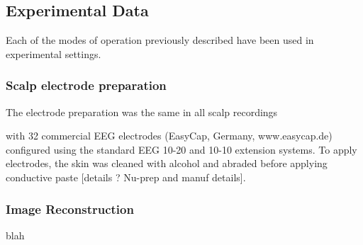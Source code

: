 \subsection{Experimental Data}


Each of the modes of operation previously described have been used in experimental settings. 

\subsubsection{Scalp electrode preparation}
The electrode preparation was the same in all scalp recordings

with 32 commercial EEG electrodes (EasyCap, Germany, www.easycap.de) configured using the standard EEG 10-20 \cite{Jasper1958} and 10-10 extension \cite{Oostenveld2001} systems. To apply electrodes, the skin was cleaned with alcohol and abraded before applying conductive paste [details ? Nu-prep and manuf details].



\subsubsection{Image Reconstruction}
blah












